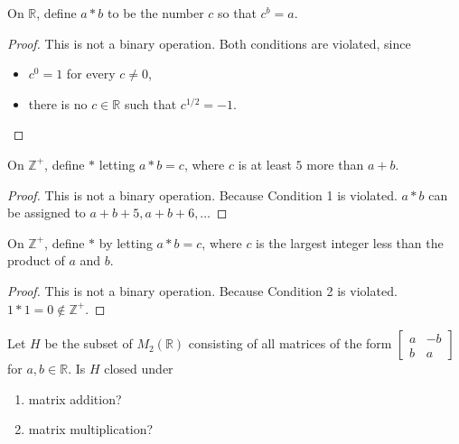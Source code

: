 \begin{exercise}
    On $\mathbb{R}$, define $a * b$ to be the number $c$ so that $c^{b} = a$.
\end{exercise}

\begin{proof}
    This is not a binary operation. Both conditions are violated, since
    \begin{itemize}
        \item $c^{0} = 1$ for every $c\ne 0$,
        \item there is no $c\in\mathbb{R}$ such that $c^{1/2} = -1$.
    \end{itemize}
\end{proof}

\begin{exercise}
    On $\mathbb{Z}^{+}$, define $*$ letting $a * b = c$, where $c$ is at least $5$ more than $a + b$.
\end{exercise}

\begin{proof}
    This is not a binary operation. Because Condition 1 is violated. $a * b$ can be assigned to $a + b + 5, a + b + 6, \ldots$
\end{proof}

\begin{exercise}
    On $\mathbb{Z}^{+}$, define $*$ by letting $a * b = c$, where $c$ is the largest integer less than the product of $a$ and $b$.
\end{exercise}

\begin{proof}
    This is not a binary operation. Because Condition 2 is violated. $1 * 1 = 0\notin\mathbb{Z}^{+}$.
\end{proof}

\begin{exercise}
    Let $H$ be the subset of $M_{2}(\mathbb{R})$ consisting of all matrices of the form $\begin{bmatrix}a & -b \\ b & a\end{bmatrix}$ for $a, b\in\mathbb{R}$. Is $H$ closed under
    \begin{enumerate}[label={\textbf{\alph*}}]
        \item matrix addition?
        \item matrix multiplication?
    \end{enumerate}
\end{exercise}

